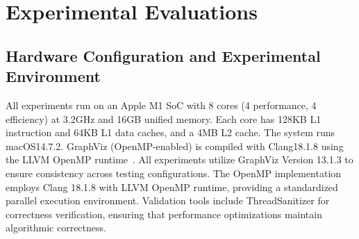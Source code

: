 \section{Experimental Evaluations}
\label{sec:results}

\subsection{Hardware Configuration and Experimental Environment}

All experiments run on an Apple M1 SoC with 8 cores (4 performance, 4 efficiency) at 3.2GHz and 16GB unified memory. Each core has 128KB L1 instruction and 64KB L1 data caches, and a 4MB L2 cache. The system runs macOS14.7.2. GraphViz (OpenMP-enabled) is compiled with Clang18.1.8 using the LLVM OpenMP runtime~\cite{llvm2020openmp}. All experiments utilize GraphViz Version 13.1.3 to ensure consistency across testing configurations. The OpenMP implementation employs Clang 18.1.8 with LLVM OpenMP runtime, providing a standardized parallel execution environment. 
Validation tools include ThreadSanitizer for correctness verification, ensuring that performance optimizations maintain algorithmic correctness.

